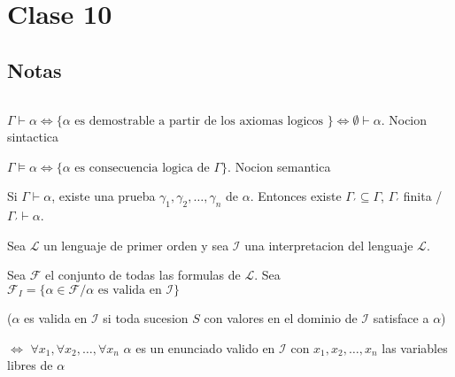 \section{Clase 10}

\subsection{Notas}
$\;$

$\Gamma \vdash \alpha \iff \{ \alpha \text{ es demostrable a partir de los axiomas logicos } \} \iff \emptyset \vdash \alpha$. Nocion sintactica

$\Gamma \models \alpha \iff \{ \alpha \text{ es consecuencia logica de } \Gamma \}$. Nocion semantica

\begin{observation}

Si $\Gamma \vdash \alpha$, existe una prueba $\gamma_1, \gamma_2, \ldots, \gamma_n$ de $\alpha$. Entonces existe $\Gamma_{'} \subseteq \Gamma$, $\Gamma_{'}$ finita / $\Gamma_{'} \vdash \alpha$.

\end{observation}

\begin{observation}

Sea $\mathcal{L}$ un lenguaje de primer orden y sea $\mathcal{I}$ una interpretacion del lenguaje $\mathcal{L}$.

Sea $\mathcal{F}$ el conjunto de todas las formulas de $\mathcal{L}$. Sea $\mathcal{F}_{I} = \{ \alpha \in \mathcal{F} / \alpha \text{ es valida en } \mathcal{I} \}$ 

($\alpha$ es valida en $\mathcal{I}$ si toda sucesion $S$ con valores en el dominio de $\mathcal{I}$ satisface a $\alpha$) 

$\iff$ $\forall x_1, \forall x_2, \ldots, \forall x_n $ $\alpha$ es un enunciado valido en $\mathcal{I}$ con $x_1, x_2, \ldots, x_n$ las variables libres de $\alpha$

\end{observation}


